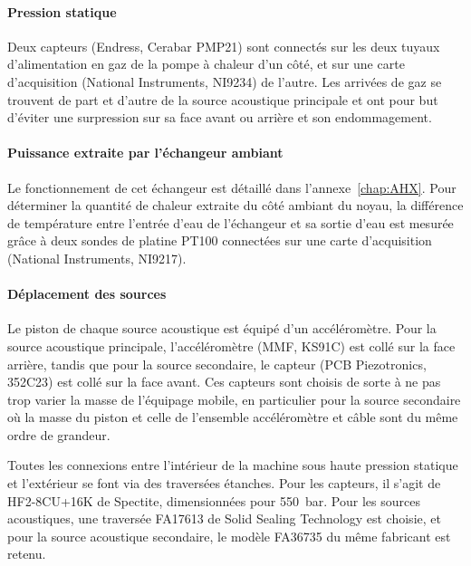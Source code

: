 \paragraph*{Pression statique} Deux capteurs (Endress, Cerabar PMP21) sont connectés sur les deux tuyaux d'alimentation en gaz de la pompe  à chaleur d'un côté, et sur une carte d'acquisition (National Instruments, NI9234) de l'autre. Les arrivées de gaz se trouvent de part et d'autre de la source acoustique principale et ont pour but d'éviter une surpression sur sa face avant ou arrière et son endommagement.

\paragraph*{Puissance extraite par l'échangeur ambiant} Le fonctionnement de cet échangeur est détaillé dans l'annexe~\ref{chap:AHX}. Pour déterminer la quantité de chaleur extraite du côté ambiant du noyau, la différence de température entre l'entrée d'eau de l'échangeur et sa sortie d'eau est mesurée grâce à deux sondes de platine PT100 connectées sur une carte d'acquisition (National Instruments, NI9217).

\paragraph*{Déplacement des sources} Le piston de chaque source acoustique est équipé d'un accéléromètre. Pour la source acoustique principale, l'accéléromètre (MMF, KS91C) est collé sur la face arrière, tandis que pour la source secondaire, le capteur (PCB Piezotronics, 352C23) est collé sur la face avant. Ces capteurs sont choisis de sorte à ne pas trop varier la masse de l'équipage mobile, en particulier pour la source secondaire où la masse du piston et celle de l'ensemble accéléromètre et câble sont du même ordre de grandeur.\bigskip

Toutes les connexions entre l'intérieur de la machine sous haute pression statique et l'extérieur se font via des traversées étanches. Pour les capteurs, il s'agit de HF2-8CU+16K de Spectite, dimensionnées pour \qty{550}{\bar}. Pour les sources acoustiques, une traversée FA17613 de Solid Sealing Technology est choisie, et pour la source acoustique secondaire, le modèle FA36735 du même fabricant est retenu.



